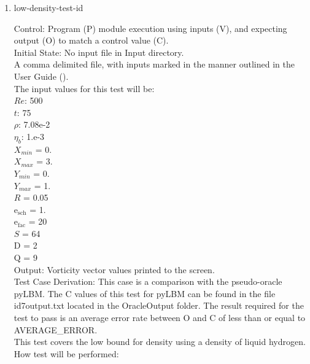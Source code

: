 \documentclass[12pt, titlepage]{article}
\newcounter{testcounter} %
\begin{document}
\begin{enumerate}
\item{low-density-test-id\thetestcounter \\}

Control: Program (P) module execution using inputs (V), and expecting output (O) to match a control value (C).\\
					
Initial State: No input file in Input directory.\\
					
A comma delimited file, with inputs marked in the manner outlined in the User Guide (\citet{LBM_UserGuide_PM}).\\The input values for this test will be:\\
$Re$: 500\\
$t$: 75\\
$\rho$: 7.08e-2\\
$\eta_b$: 1.e-3\\
$X_{min}$ = 0.\\
$X_{max}$ = 3.\\
$Y_{min}$ = 0.\\
$Y_{max}$ = 1.\\
$R$ = 0.05\\
$\mathrm{e_{sch}}$ = 1.\\
$\mathrm{e_{fac}}$ = 20\\
$S$ = 64\\
$\mathrm{D}$ = 2\\
$\mathrm{Q}$ = 9\\

Output: Vorticity vector values printed to the screen. \\

Test Case Derivation: This case is a comparison with the pseudo-oracle pyLBM. The C values of this test for pyLBM can be found in the file id7output.txt located in the OracleOutput folder. The result required for the test to pass is an average error rate between O and C of less than or equal to AVERAGE\_ERROR.\\
This test covers the low bound for density using a density of liquid hydrogen.\\

					
How test will be performed: 


\end{enumerate}
\end{document}
